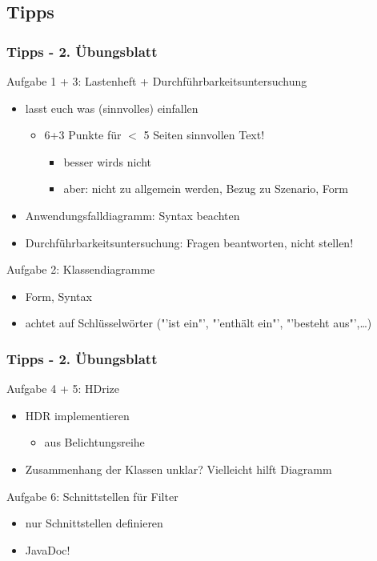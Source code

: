 \documentclass[18pt]{beamer}
\begin{document}
	\subsection{Tipps}
	\begin{frame}
		\frametitle{Tipps - 2. Übungsblatt}
		\begin{small}
			\begin{exampleblock}{Aufgabe 1 + 3: Lastenheft + Durchführbarkeitsuntersuchung}
				\begin{itemize}
					\item lasst euch was (sinnvolles) einfallen
					\begin{itemize}
						\item 6+3 Punkte für $<$ 5 Seiten sinnvollen Text! 
						\begin{itemize}
							\item besser wirds nicht
							\item aber: nicht zu allgemein werden, Bezug zu Szenario, Form
						\end{itemize}
					\end{itemize}
					\item Anwendungsfalldiagramm: Syntax beachten
					\item Durchführbarkeitsuntersuchung: Fragen beantworten, nicht stellen!
				\end{itemize}
			\end{exampleblock}
			\pause
			\begin{exampleblock}{Aufgabe 2: Klassendiagramme}
				\begin{itemize}
					\item Form, Syntax
					\item achtet auf Schlüsselwörter ("'ist ein"', "'enthält ein"', "'besteht aus"',\dots)
				\end{itemize}
			\end{exampleblock}
		\end{small}
	\end{frame}

	\begin{frame}
\frametitle{Tipps - 2. Übungsblatt}
	\begin{exampleblock}{Aufgabe 4 + 5: HDrize}
		\begin{itemize}
			\item HDR implementieren
			\begin{itemize}
				\item aus Belichtungsreihe
			\end{itemize}
			\item Zusammenhang der Klassen unklar? Vielleicht hilft Diagramm
		\end{itemize}
	\end{exampleblock}
\pause
	\begin{exampleblock}{Aufgabe 6: Schnittstellen für Filter}
		\begin{itemize}
			\item nur Schnittstellen definieren
			\item JavaDoc!
		\end{itemize}
	\end{exampleblock}
\end{frame}
	
\end{document}
